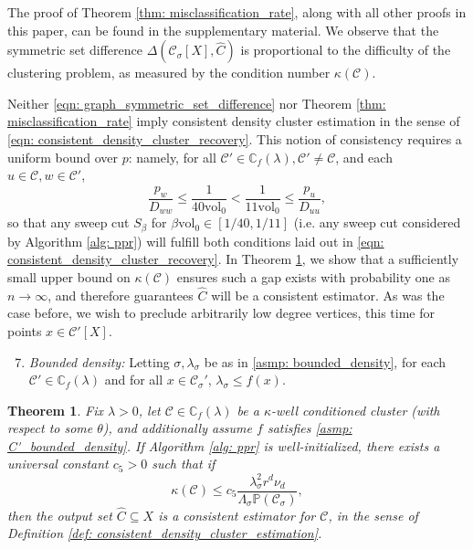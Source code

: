 \documentclass{article}
\newcommand{\vol}{\mathrm{vol}}
\newcommand{\1}{\mathbf{1}}
\newcommand{\pbf}{p}        %
\newcommand{\Xbf}{X}             %
\newcommand{\Dbf}{D}
\newcommand{\Pbb}{\mathbb{P}}
\newcommand{\Cbb}{\mathbb{C}}
\newcommand{\Cset}{\mathcal{C}}
\newcommand{\Csig}{\Cset_{\sigma}}
\newcommand{\Cest}{\widehat{C}}
\theoremstyle{aldenthm}
\newtheorem{theorem}{Theorem}
\theoremstyle{aldenrmrk}
\begin{document}
The proof of Theorem \ref{thm: misclassification_rate}, along with all other proofs in this paper, can be found in the supplementary material. We observe that the symmetric set difference $\Delta(\Csig[\Xbf], \Cest)$  is proportional to the difficulty of the clustering problem, as measured by the condition number $\kappa(\Cset)$.

Neither \eqref{eqn: graph_symmetric_set_difference} nor Theorem \ref{thm: misclassification_rate} imply consistent density cluster estimation in the sense of \eqref{eqn: consistent_density_cluster_recovery}. This notion of consistency requires a uniform bound over $\pbf$: namely, for all $\Cset' \in \Cbb_f(\lambda), \Cset' \neq \Cset$, and each $u \in \Cset, w \in \Cset'$,
\begin{equation}
\label{eqn: ppr_gap}
\frac{p_{w}}{\Dbf_{ww}} \leq \frac{1}{40\vol_0} < \frac{1}{11\vol_0} \leq \frac{p_u}{\Dbf_{uu}},
\end{equation}
so that any sweep cut $S_{\beta}$ for $\beta \vol_0 \in [1/40,1/11]$ (i.e. any sweep cut considered by Algorithm \ref{alg: ppr}) will fulfill both conditions laid out in \eqref{eqn: consistent_density_cluster_recovery}. In Theorem \ref{thm: consistent_recovery_of_density_clusters}, we show that a sufficiently small upper bound on $\kappa(\Cset)$ ensures such a gap exists with probability one as $n \to \infty$, and therefore guarantees $\Cest$ will be a consistent estimator. As was the case before, we wish to preclude arbitrarily low degree vertices, this time for points $x \in \Cset'[\Xbf]$.
\begin{enumerate}[label=(A\arabic*)]
	\setcounter{enumi}{6}
	\item 
	\label{asmp: C'_bounded_density}
	\emph{Bounded density:} Letting $\sigma,\lambda_{\sigma}$ be as in \ref{asmp: bounded_density}, for each $\Cset' \in \Cbb_f(\lambda)$ and for all $x \in \Csig'$, $\lambda_{\sigma} \leq f(x)$.
\end{enumerate}

\begin{theorem}
	\label{thm: consistent_recovery_of_density_clusters}
	Fix $\lambda > 0$, let $\Cset \in \Cbb_f(\lambda)$ be a $\kappa$-well conditioned cluster (with respect to some $\theta$), and additionally assume $f$ satisfies \ref{asmp: C'_bounded_density}. If Algorithm \ref{alg: ppr} is well-initialized, there exists a universal constant $c_5 > 0$ such that if
	\begin{equation}
	\label{eqn: kappa_ub}
	\kappa(\Cset) \leq c_5 \frac{\lambda_{\sigma}^2r^d \nu_d}{\Lambda_{\sigma}\Pbb(\Csig)},
	\end{equation}
	then the output set $\Cest \subseteq \Xbf$ is a consistent estimator for $\Cset$, in the sense of Definition \ref{def: consistent_density_cluster_estimation}.
\end{theorem}
\end{document}
